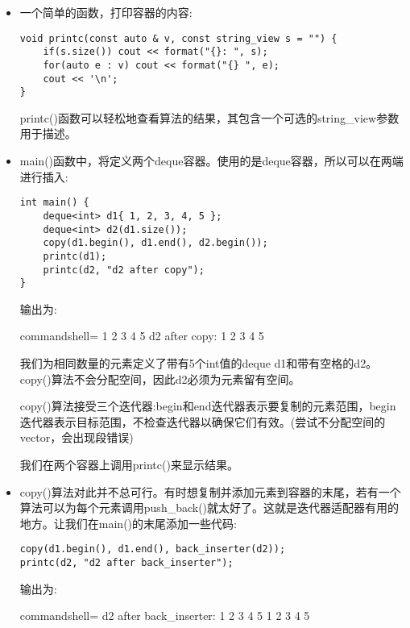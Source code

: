 \begin{itemize}
\item 
一个简单的函数，打印容器的内容:

\begin{lstlisting}[style=styleCXX]
void printc(const auto & v, const string_view s = "") {
	if(s.size()) cout << format("{}: ", s);
	for(auto e : v) cout << format("{} ", e);
	cout << '\n';
}
\end{lstlisting}

printc()函数可以轻松地查看算法的结果，其包含一个可选的string\_view参数用于描述。

\item 
main()函数中，将定义两个deque容器。使用的是deque容器，所以可以在两端进行插入:

\begin{lstlisting}[style=styleCXX]
int main() {
	deque<int> d1{ 1, 2, 3, 4, 5 };
	deque<int> d2(d1.size());
	copy(d1.begin(), d1.end(), d2.begin());
	printc(d1);
	printc(d2, "d2 after copy");
}
\end{lstlisting}

输出为:

\begin{tcblisting}{commandshell={}}
1 2 3 4 5
d2 after copy: 1 2 3 4 5
\end{tcblisting}

我们为相同数量的元素定义了带有5个int值的deque d1和带有空格的d2。copy()算法不会分配空间，因此d2必须为元素留有空间。

copy()算法接受三个迭代器:begin和end迭代器表示要复制的元素范围，begin迭代器表示目标范围，不检查迭代器以确保它们有效。(尝试不分配空间的vector，会出现段错误)

我们在两个容器上调用printc()来显示结果。

\item 
copy()算法对此并不总可行。有时想复制并添加元素到容器的末尾，若有一个算法可以为每个元素调用push\_back()就太好了。这就是迭代器适配器有用的地方。让我们在main()的末尾添加一些代码:

\begin{lstlisting}[style=styleCXX]
copy(d1.begin(), d1.end(), back_inserter(d2));
printc(d2, "d2 after back_inserter");
\end{lstlisting}

输出为:

\begin{tcblisting}{commandshell={}}
d2 after back_inserter: 1 2 3 4 5 1 2 3 4 5
\end{tcblisting}


\end{itemize}
